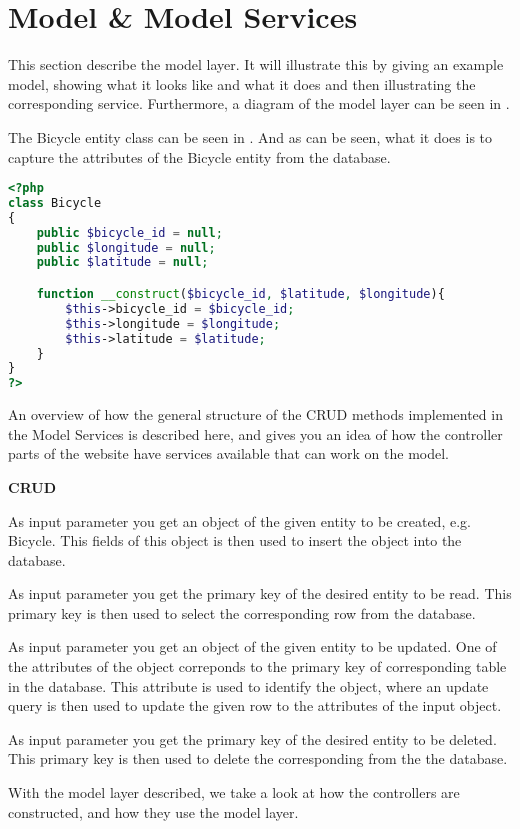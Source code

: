 \section{Model \& Model Services}
This section describe the model layer.
It will illustrate this by giving an example model, showing what it looks like and what it does and then illustrating the corresponding service.
Furthermore, a diagram of the model layer can be seen in .

The Bicycle entity class can be seen in .
And as can be seen, what it does is to capture the attributes of the Bicycle entity from the database.

\begin{minipage}{\textwidth}
\begin{lstlisting}[language=php, label=lst:bicycleModel, caption={Bicycle Class}]
<?php
class Bicycle
{
    public $bicycle_id = null;
    public $longitude = null;
    public $latitude = null;

    function __construct($bicycle_id, $latitude, $longitude){
        $this->bicycle_id = $bicycle_id;
        $this->longitude = $longitude;
        $this->latitude = $latitude;
    }
}
?>
\end{lstlisting}
\end{minipage}

An overview of how the general structure of the CRUD methods implemented in the Model Services is described here, and gives you an idea of how the controller parts of the website have services available that can work on the model.

\textbf{CRUD}
\begin{description}[style=nextline]
	\item[Create]
	As input parameter you get an object of the given entity to be created, e.g. Bicycle.
	This fields of this object is then used to insert the object into the database.
	
	\item[Read]
	As input parameter you get the primary key of the desired entity to be read.
	This primary key is then used to select the corresponding row from the database.
	
	\item[Update]
	As input parameter you get an object of the given entity to be updated.
	One of the attributes of the object correponds to the primary key of corresponding table in the database.
	This attribute is used to identify the object, where an update query is then used to update the given row to the attributes of the input object.
	
	\item[Delete]
	As input parameter you get the primary key of the desired entity to be deleted.
	This primary key is then used to delete the corresponding from the the database.
	
\end{description}

With the model layer described, we take a look at how the controllers are constructed, and how they use the model layer.